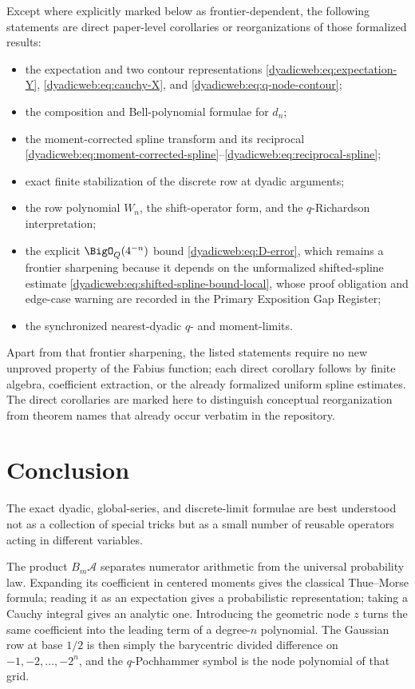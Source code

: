 \documentclass[11pt,oneside]{article}
\theoremstyle{definition}
\theoremstyle{remark}
\begin{document}
Except where explicitly marked below as frontier-dependent, the following statements are
direct paper-level corollaries or reorganizations of those formalized results:
\begin{itemize}
\item the expectation and two contour representations
      \eqref{dyadicweb:eq:expectation-Y}, \eqref{dyadicweb:eq:cauchy-X}, and \eqref{dyadicweb:eq:q-node-contour};
\item the composition and Bell-polynomial formulae for $d_n$;
\item the moment-corrected spline transform and its reciprocal
      \eqref{dyadicweb:eq:moment-corrected-spline}--\eqref{dyadicweb:eq:reciprocal-spline};
\item exact finite stabilization of the discrete row at dyadic arguments;
\item the row polynomial $W_n$, the shift-operator form, and the $q$-Richardson interpretation;
\item the explicit $\BigO_Q(4^{-n})$ bound \eqref{dyadicweb:eq:D-error}, which remains a
      frontier sharpening because it depends on the unformalized shifted-spline estimate
      \eqref{dyadicweb:eq:shifted-spline-bound-local}, whose proof obligation and edge-case
      warning are recorded in the Primary Exposition Gap Register;
\item the synchronized nearest-dyadic $q$- and moment-limits.
\end{itemize}
Apart from that frontier sharpening, the listed statements require no new unproved property
of the Fabius function; each direct corollary follows by finite algebra, coefficient
extraction, or the already formalized uniform spline estimates.  The direct corollaries are
marked here to distinguish conceptual reorganization from theorem names that already occur
verbatim in the repository.

\section{Conclusion}
\label{dyadicweb:sec:conclusion}

The exact dyadic, global-series, and discrete-limit formulae are best understood not as a
collection of special tricks but as a small number of reusable operators acting in different
variables.

The product $B_m\mathscr A$ separates numerator arithmetic from the universal probability
law.  Expanding its coefficient in centered moments gives the classical Thue--Morse formula;
reading it as an expectation gives a probabilistic representation; taking a Cauchy integral
gives an analytic one.  Introducing the geometric node $z$ turns the same coefficient into
the leading term of a degree-$n$ polynomial.  The Gaussian row at base $1/2$ is then simply
the barycentric divided difference on $-1,-2,\ldots,-2^n$, and the $q$-Pochhammer symbol is the
node polynomial of that grid.
\end{document}
